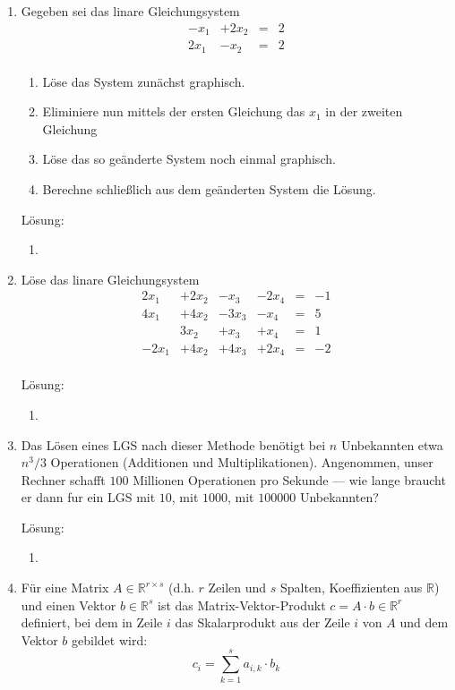 \documentclass[../main.tex]{subfiles}
\begin{document}
\begin{enumerate}
	\item Gegeben sei das linare Gleichungsystem
	      \[ \begin{array}{cccc}
			      -x_1 & +2 x_2 & = & 2 \\
			      2x_1 & -x_2   & = & 2 \\
		      \end{array} \]
	      \begin{enumerate}
		      \item Löse das System zunächst graphisch.
		      \item Eliminiere nun mittels der ersten Gleichung das \( x_1 \)
		            in der zweiten Gleichung
		      \item Löse das so geänderte System noch einmal graphisch.
		      \item Berechne schließlich aus dem geänderten System die Lösung.
	      \end{enumerate}

	      Lösung:
	      \begin{enumerate}
		      \item
	      \end{enumerate}
	\item Löse das linare Gleichungsystem
	      \[ \begin{array}{cccccc}
			      2x_1  & +2x_2 & -x_3  & -2x_4 & = & -1 \\
			      4x_1  & +4x_2 & -3x_3 & -x_4  & = & 5  \\
			            & 3x_2  & +x_3  & +x_4  & = & 1  \\
			      -2x_1 & +4x_2 & +4x_3 & +2x_4 & = & -2 \\
		      \end{array} \]

	      Lösung:
	      \begin{enumerate}
		      \item
	      \end{enumerate}
	\item Das Lösen eines LGS nach dieser Methode benötigt bei \( n \) Unbekannten etwa
	      \( n^3/3 \) Operationen (Additionen und Multiplikationen). Angenommen, unser
	      Rechner schafft \( 100 \) Millionen Operationen pro Sekunde — wie lange braucht
	      er dann fur ein LGS mit \( 10 \), mit \( 1000 \), mit \( 100000 \) Unbekannten?

	      Lösung:
	      \begin{enumerate}
		      \item
	      \end{enumerate}
	\item Für eine Matrix \( A \in \mathbb{R}^{ r \times s } \) (d.h. \( r \) Zeilen und \( s \)
	      Spalten, Koeffizienten aus
	      \( \mathbb{R} \)) und einen Vektor \( b \in \mathbb{R}^s \) ist das Matrix-Vektor-Produkt
	      \( c = A \cdot b \in \mathbb{R}^r \) definiert, bei dem in Zeile \( i \) das Skalarprodukt
	      aus der Zeile \( i \) von \( A \) und dem Vektor \( b \) gebildet wird:
	      \[ c_i = \sum_{ k = 1 }^{s} a_{i,k} \cdot b_k \]


\end{enumerate}
\end{document}
